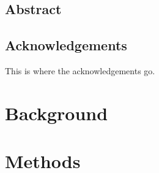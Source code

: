 

\frontmatter

\thetitlepage
\cleardoublepage
\setcounter{page}{1}

\section{Abstract}
\uwabstract
\cleardoublepage

\section{Acknowledgements}

This is where the acknowledgements go. %

\clearpage

\tableofcontents\clearpage
\listoffigures\clearpage
\listoftables\clearpage

\mainmatter

\chapter{Background}

\chapter{Methods}





